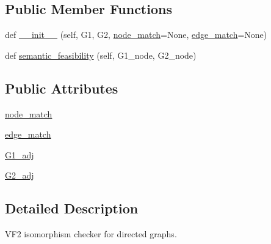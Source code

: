 \subsection*{Public Member Functions}
\begin{DoxyCompactItemize}
\item 
def \hyperlink{classnetworkx_1_1algorithms_1_1isomorphism_1_1vf2userfunc_1_1DiGraphMatcher_a3ab15e97a93ee0fdfd19d74d631dcf72}{\+\_\+\+\_\+init\+\_\+\+\_\+} (self, G1, G2, \hyperlink{classnetworkx_1_1algorithms_1_1isomorphism_1_1vf2userfunc_1_1DiGraphMatcher_aa7bdd09cb01974d946945bf7528dbaa5}{node\+\_\+match}=None, \hyperlink{classnetworkx_1_1algorithms_1_1isomorphism_1_1vf2userfunc_1_1DiGraphMatcher_a8a35045f1dca6976b6b2fc7b9cd71c8a}{edge\+\_\+match}=None)
\item 
def \hyperlink{classnetworkx_1_1algorithms_1_1isomorphism_1_1vf2userfunc_1_1DiGraphMatcher_aeb9ce88bc4149f487e017e30faca74ec}{semantic\+\_\+feasibility} (self, G1\+\_\+node, G2\+\_\+node)
\end{DoxyCompactItemize}
\subsection*{Public Attributes}
\begin{DoxyCompactItemize}
\item 
\hyperlink{classnetworkx_1_1algorithms_1_1isomorphism_1_1vf2userfunc_1_1DiGraphMatcher_aa7bdd09cb01974d946945bf7528dbaa5}{node\+\_\+match}
\item 
\hyperlink{classnetworkx_1_1algorithms_1_1isomorphism_1_1vf2userfunc_1_1DiGraphMatcher_a8a35045f1dca6976b6b2fc7b9cd71c8a}{edge\+\_\+match}
\item 
\hyperlink{classnetworkx_1_1algorithms_1_1isomorphism_1_1vf2userfunc_1_1DiGraphMatcher_a16304036e55e2ec1677a46bf0710e33c}{G1\+\_\+adj}
\item 
\hyperlink{classnetworkx_1_1algorithms_1_1isomorphism_1_1vf2userfunc_1_1DiGraphMatcher_a0ddb9304aaa632107a22b0d955662c6e}{G2\+\_\+adj}
\end{DoxyCompactItemize}


\subsection{Detailed Description}
\begin{DoxyVerb}VF2 isomorphism checker for directed graphs.\end{DoxyVerb}
 

